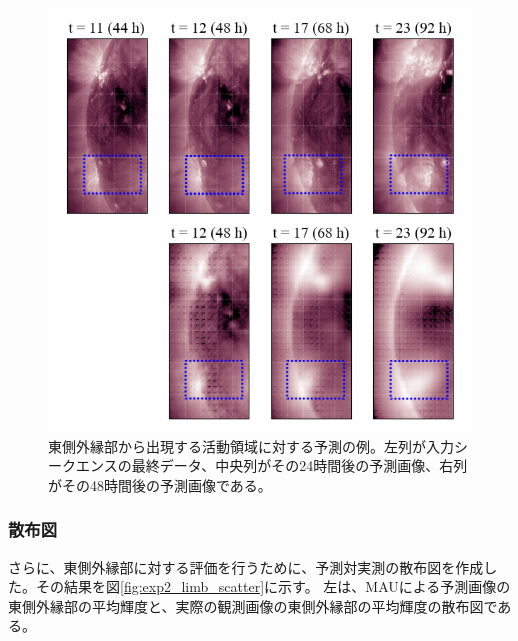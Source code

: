         \begin{figure}[htbp]
          \centering
          \includegraphics[width=\textwidth]{figures/exp2/limb_sample_12_caption.jpg}
          \caption{東側外縁部から出現する活動領域に対する予測の例。左列が入力シークエンスの最終データ、中央列がその24時間後の予測画像、右列がその48時間後の予測画像である。}
          \label{fig:exp2_limb_example_2}
        \end{figure}

      \subsubsection{散布図}
        さらに、東側外縁部に対する評価を行うために、予測対実測の散布図を作成した。その結果を図\ref{fig:exp2_limb_scatter}に示す。
        左は、MAUによる予測画像の東側外縁部の平均輝度と、実際の観測画像の東側外縁部の平均輝度の散布図である。

